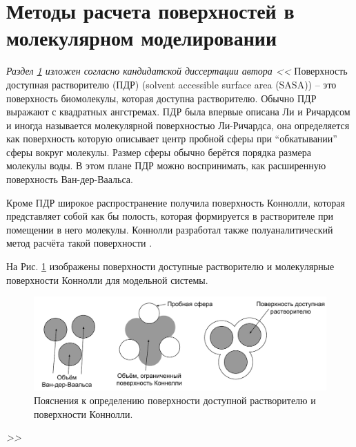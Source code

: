 \section{Методы расчета поверхностей в молекулярном моделировании} \label{part1_3_sasa}
\textit{Раздел \ref{part1_3_sasa} изложен согласно кандидатской диссертации автора \cite{shaytan_thesis_kfmn_2010} << }
Поверхность доступная растворителю (ПДР) (solvent accessible surface area (SASA)) -- это поверхность биомолекулы, которая доступна растворителю. Обычно ПДР выражают с квадратных ангстремах. ПДР была впервые описана Ли и Ричардсом\cite{lee_richards} и иногда называется молекулярной поверхностью Ли-Ричардса, она определяется как поверхность которую описывает центр пробной сферы при ``обкатывании'' сферы вокруг молекулы. Размер сферы обычно берётся порядка размера молекулы воды. В этом плане ПДР можно воспринимать, как расширенную поверхность Ван-дер-Ваальса.

Кроме ПДР широкое распространение получила поверхность Коннолли, которая представляет собой как бы полость, которая формируется в растворителе при помещении в него молекулы. Коннолли разработал также полуаналитический метод расчёта такой поверхности \cite{connolly_1983}.

На Рис. \ref{f:2_surf} изображены поверхности доступные растворителю и молекулярные поверхности Коннолли для модельной системы.

\begin{figure}[htbp]
   \centering
   \includegraphics[width=15cm]{images/2_surf}
      \caption{Пояснения к определению поверхности доступной растворителю и поверхности Коннолли.}
   \label{f:2_surf}
\end{figure}
\textit{>>}